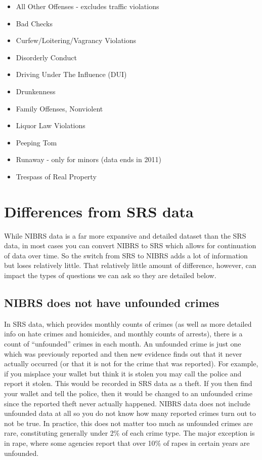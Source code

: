 \documentclass[
]{krantz}
\providecommand{\tightlist}{%
  \setlength{\itemsep}{0pt}\setlength{\parskip}{0pt}}
\begin{document}
\begin{itemize}
\tightlist
\item
  All Other Offenses - excludes traffic violations
\item
  Bad Checks\\
\item
  Curfew/Loitering/Vagrancy Violations
\item
  Disorderly Conduct\\
\item
  Driving Under The Influence (DUI)
\item
  Drunkenness\\
\item
  Family Offenses, Nonviolent
\item
  Liquor Law Violations\\
\item
  Peeping Tom
\item
  Runaway - only for minors (data ends in 2011)
\item
  Trespass of Real Property
\end{itemize}

\section{Differences from SRS
data}\label{differences-from-srs-data}

While NIBRS data is a far more expansive and detailed
dataset than the SRS data, in most cases you can convert
NIBRS to SRS which allows for continuation of data over
time. So the switch from SRS to NIBRS adds a lot of
information but loses relatively little. That relatively
little amount of difference, however, can impact the types
of questions we can ask so they are detailed below.

\subsection{NIBRS does not have unfounded
crimes}\label{nibrs-does-not-have-unfounded-crimes}

In SRS data, which provides monthly counts of crimes (as
well as more detailed info on hate crimes and homicides, and
monthly counts of arrests), there is a count of
``unfounded'' crimes in each month. An unfounded crime is
just one which was previously reported and then new evidence
finds out that it never actually occurred (or that it is not
for the crime that was reported). For example, if you
misplace your wallet but think it is stolen you may call the
police and report it stolen. This would be recorded in SRS
data as a theft. If you then find your wallet and tell the
police, then it would be changed to an unfounded crime since
the reported theft never actually happened. NIBRS data does
not include unfounded data at all so you do not know how
many reported crimes turn out to not be true. In practice,
this does not matter too much as unfounded crimes are rare,
constituting generally under 2\% of each crime type. The
major exception is in rape, where some agencies report that
over 10\% of rapes in certain years are unfounded.
\end{document}
